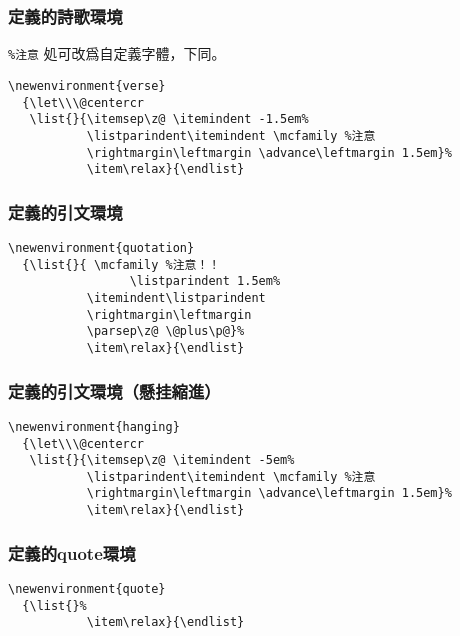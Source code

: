 \subsubsection{定義的詩歌環境}

\par \verb+%注意+ 処可改爲自定義字體，下同。
\begin{lstlisting}[firstnumber=818]
\newenvironment{verse}
  {\let\\\@centercr
   \list{}{\itemsep\z@ \itemindent -1.5em%
           \listparindent\itemindent \mcfamily %注意
           \rightmargin\leftmargin \advance\leftmargin 1.5em}%
           \item\relax}{\endlist}
\end{lstlisting}

\subsubsection{定義的引文環境}

\begin{lstlisting}[firstnumber=825]
\newenvironment{quotation}
  {\list{}{ \mcfamily %注意！！
  				 \listparindent 1.5em%
           \itemindent\listparindent
           \rightmargin\leftmargin
           \parsep\z@ \@plus\p@}%
           \item\relax}{\endlist}
\end{lstlisting}

\subsubsection{定義的引文環境（懸挂縮進）}

\begin{lstlisting}[firstnumber=834]
\newenvironment{hanging}
  {\let\\\@centercr
   \list{}{\itemsep\z@ \itemindent -5em%
           \listparindent\itemindent \mcfamily %注意
           \rightmargin\leftmargin \advance\leftmargin 1.5em}%
           \item\relax}{\endlist}
\end{lstlisting}

\subsubsection{定義的quote環境}

\begin{lstlisting}[firstnumber=841]
\newenvironment{quote}
  {\list{}%
           \item\relax}{\endlist}
\end{lstlisting}

